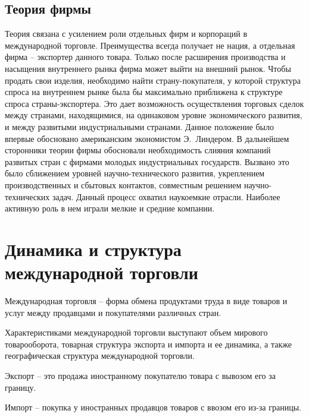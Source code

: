 \vspace*{2em} %

\section{Теория фирмы}

Теория связана с усилением роли отдельных фирм и корпораций в международной
торговле. Преимущества всегда получает не нация, а отдельная фирма -- экспортер
данного товара. Только после расширения производства и насыщения внутреннего
рынка фирма может выйти на внешний рынок. Чтобы продать свои изделия,
необходимо найти страну-покупателя, у которой структура спроса на внутреннем
рынке была бы максимально приближена к структуре спроса страны-экспортера. Это
дает возможность осуществления торговых сделок между странами, находящимися, на
одинаковом уровне экономического развития, и между развитыми индустриальными
странами. Данное положение было впервые обосновано американским экономистом
Э.~Линдером. В дальнейшем сторонники теории фирмы обосновали необходимость
слияния компаний развитых стран с фирмами молодых индустриальных государств.
Вызвано это было сближением уровней научно-технического развития, укреплением
производственных и сбытовых контактов, совместным решением научно-технических
задач. Данный процесс охватил наукоемкие отрасли. Наиболее активную роль в нем
играли мелкие и средние компании.

\pagebreak %

\chapter{Динамика и структура международной торговли}

Международная торговля -- форма обмена продуктами труда в виде товаров и услуг
между продавцами и покупателями различных стран.

Характеристиками международной торговли выступают объем мирового товарооборота,
товарная структура экспорта и импорта и ее динамика, а также географическая
структура международной торговли.

Экспорт -- это продажа иностранному покупателю товара с вывозом его за границу.

Импорт -- покупка у иностранных продавцов товаров с ввозом его из-за границы.

